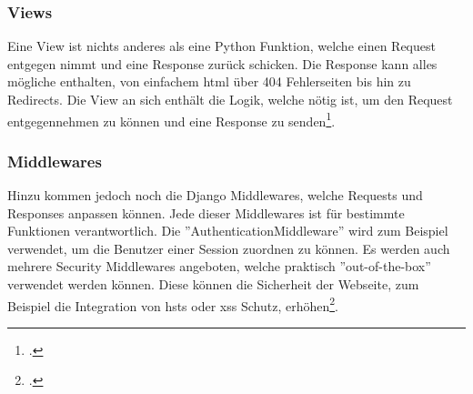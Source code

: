 \subsubsection*{Views}
Eine View ist nichts anderes als eine Python Funktion, welche einen Request entgegen nimmt und eine Response zurück schicken. Die Response kann alles mögliche enthalten, von einfachem \gls{html} über 404 Fehlerseiten bis hin zu Redirects. Die View an sich enthält die Logik, welche nötig ist, um den Request entgegennehmen zu können und eine Response zu senden\footcite{django_views}.

\subsubsection*{Middlewares}
Hinzu kommen jedoch noch die Django Middlewares, welche Requests und Responses anpassen können. Jede dieser Middlewares ist für bestimmte Funktionen verantwortlich. Die ''AuthenticationMiddleware'' wird zum Beispiel verwendet, um die Benutzer einer Session zuordnen zu können. Es werden auch mehrere Security Middlewares angeboten, welche praktisch ''out-of-the-box'' verwendet werden können. Diese können die Sicherheit der Webseite, zum Beispiel die Integration von \gls{hsts} oder \gls{xss} Schutz, erhöhen\footcite{django_middlewares}.\\


